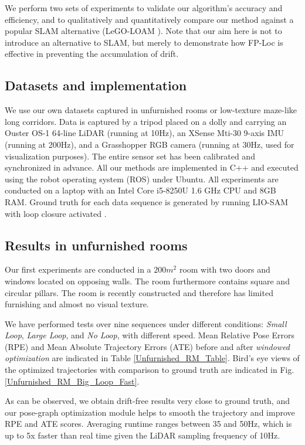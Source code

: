 \documentclass[letterpaper, 10 pt, conference]{ieeeconf}  %
\begin{document}
We perform two sets of experiments to validate our algorithm's accuracy and efficiency, and to qualitatively and quantitatively compare our method against a popular SLAM alternative (LeGO-LOAM \cite{shan2018lego}). Note that our aim here is not to introduce an alternative to SLAM, but merely to demonstrate how FP-Loc is effective in preventing the accumulation of drift.

\subsection{Datasets and implementation}

We use our own datasets captured in unfurnished rooms or low-texture maze-like long corridors. Data is captured by a tripod placed on a dolly and carrying an Ouster OS-1 64-line LiDAR (running at 10Hz), an XSense Mti-30 9-axis IMU (running at 200Hz), and a Grasshopper RGB camera (running at 30Hz, used for visualization purposes). The entire sensor set has been calibrated and synchronized in advance. All our methods are implemented in C++ and executed using the robot operating system (ROS) under Ubuntu. All experiments are conducted on a laptop with an Intel Core i5-8250U 1.6 GHz CPU and 8GB RAM. Ground truth for each data sequence is generated by running LIO-SAM with loop closure activated \cite{shan2020lio}.

\subsection{Results in unfurnished rooms}

Our first experiments are conducted in a $200m^2$ room with two doors and windows located on opposing walls. The room furthermore contains square and circular pillars. The room is recently constructed and therefore has limited furnishing and almost no visual texture.

We have performed tests over nine sequences under different conditions: \textit{Small Loop}, \textit{Large Loop}, and \textit{No Loop}, with different speed. Mean Relative Pose Errors (RPE) and Mean Absolute Trajectory Errors (ATE) \cite{sturm2012benchmark} before and after \textit{windowed optimization} are indicated in Table \ref{Unfurnished_RM_Table}. Bird's eye views of the optimized trajectories with comparison to ground truth are indicated in Fig. \ref{Unfurnished_RM_Big_Loop_Fast}.

As can be observed, we obtain drift-free results very close to ground truth, and our pose-graph optimization module helps to smooth the trajectory and improve RPE and ATE scores. Averaging runtime ranges between 35 and 50Hz, which is up to 5x faster than real time given the LiDAR sampling frequency of 10Hz.
\end{document}

